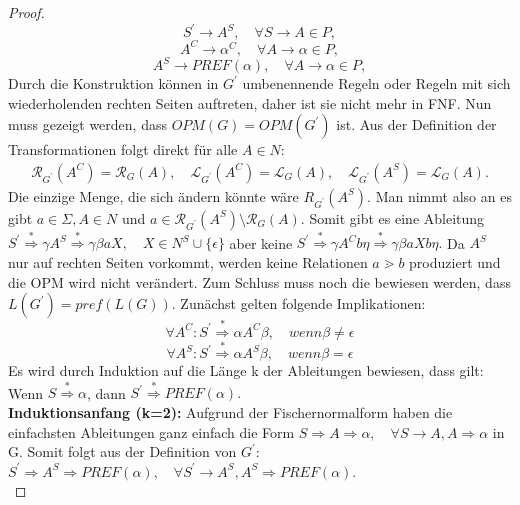 \begin{proof}
\begin{equation*}
S^\prime \rightarrow A^S, \quad \forall S\rightarrow A \in P,
\end{equation*}
\begin{equation*}
A^C \rightarrow \alpha^C, \quad \forall A\rightarrow \alpha \in P,
\end{equation*}
\begin{equation*}
A^S \rightarrow PREF(\alpha), \quad \forall A\rightarrow \alpha \in P,
\end{equation*}
Durch die Konstruktion können in $G^\prime$ umbenennende Regeln oder Regeln mit sich wiederholenden rechten Seiten auftreten, daher ist sie nicht mehr in FNF.
Nun muss gezeigt werden, dass $OPM(G)=OPM(G^\prime)$ ist. Aus der Definition der Transformationen folgt  direkt für alle $A \in N$:
\begin{align*}
\mathcal{R}_{G^\prime}(A^C)=\mathcal{R}_G(A), \quad \mathcal{L}_{G^\prime}(A^C)=\mathcal{L}_G(A), \quad \mathcal{L}_{G^\prime}(A^S)=\mathcal{L}_G(A).
\end{align*}
Die einzige Menge, die sich ändern könnte wäre $R_{G^\prime}(A^S)$. Man nimmt also an es gibt $a \in \Sigma, A \in N$ und $a \in \mathcal{R}_{G^\prime}(A^S) \setminus \mathcal{R}_G (A)$. Somit gibt es eine Ableitung $S^\prime \stackrel{*}{\Rightarrow} \gamma A^S \stackrel{*}{\Rightarrow} \gamma \beta a X, \quad X \in N^S \cup \{ \epsilon\}$ aber keine $S^\prime \stackrel{*}{\Rightarrow} \gamma A^C  b \eta\stackrel{*}{\Rightarrow} \gamma \beta a X b \eta.$
Da $A^S$ nur auf rechten Seiten vorkommt, werden keine Relationen $a \gtrdot b$ produziert und die OPM wird nicht verändert.
Zum Schluss muss noch die bewiesen werden, dass $L(G^\prime)=pref(L(G))$. Zunächst gelten folgende Implikationen: \begin{equation}
\forall A^C: S^\prime \stackrel{*}{\Rightarrow} \alpha A^C \beta, \quad wenn \beta \neq \epsilon
\end{equation}
\begin{equation}
\forall A^S: S^\prime \stackrel{*}{\Rightarrow} \alpha A^S \beta, \quad wenn \beta = \epsilon
\end{equation}
Es wird durch Induktion auf die Länge k der Ableitungen bewiesen, dass gilt: Wenn $S \stackrel{*}{\Rightarrow} \alpha$, dann $S^\prime \stackrel{*}{\Rightarrow} PREF(\alpha).$ \\
\textbf{Induktionsanfang (k=2):}
Aufgrund der Fischernormalform haben die einfachsten Ableitungen ganz einfach die Form $S \Rightarrow A \Rightarrow \alpha, \quad \forall S \rightarrow A, A \Rightarrow \alpha$ in G. Somit folgt aus der Definition von $G^\prime$:$S^\prime \Rightarrow A^S \Rightarrow PREF(\alpha), \quad \forall S^\prime \rightarrow A^S, A^S \Rightarrow PREF(\alpha)$.\\

\end{proof}
